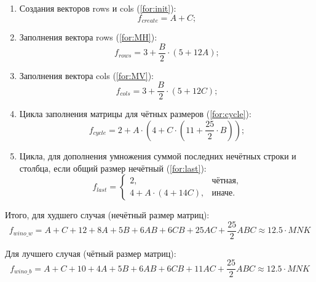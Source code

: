 \begin{enumerate}
    \item Создания векторов rows и cols (\ref{for:init}):
    \begin{equation}
        \label{for:init}
        f_{create} = A + C;
    \end{equation}

    \item Заполнения вектора rows (\ref{for:MH}):
    \begin{equation}
        \label{for:MH}
        f_{rows} = 3 + \frac{B}{2} \cdot (5 + 12A);
    \end{equation}

    \item Заполнения вектора cols (\ref{for:MV}):
    \begin{equation}
        \label{for:MV}
        f_{cols} = 3 + \frac{B}{2} \cdot (5 + 12C);
    \end{equation}

    \item Цикла заполнения матрицы для чётных размеров (\ref{for:cycle}):
    \begin{equation}
        \label{for:cycle}
        f_{cycle} = 2 + A \cdot (4 + C \cdot (11 + \frac{25}{2} \cdot B));
    \end{equation}

    \item Цикла, для дополнения умножения суммой последних нечётных строки и столбца, если общий размер нечётный (\ref{for:last}):
    \begin{equation}
        \label{for:last}
        f_{last} = \begin{cases}
                       2, & \text{чётная,}\\
                       4 + A \cdot (4 + 14C), & \text{иначе.}
        \end{cases}
    \end{equation}
\end{enumerate}

Итого, для худшего случая (нечётный размер матриц):
\begin{equation}
    \label{for:bad}
    f_{wino\_w} = A + C + 12 + 8A + 5B + 6AB + 6CB + 25AC + \frac{25}{2}ABC \approx 12.5 \cdot MNK
\end{equation}

Для лучшего случая (чётный размер матриц):
\begin{equation}
    \label{for:good}
    f_{wino\_b} = A + C + 10 + 4A + 5B + 6AB + 6CB + 11AC + \frac{25}{2}ABC \approx 12.5 \cdot MNK
\end{equation}

